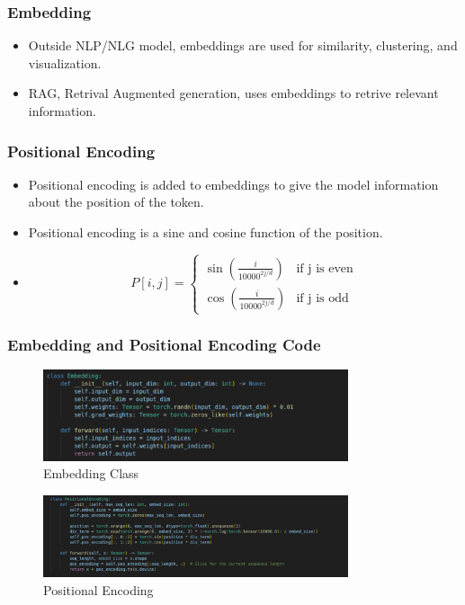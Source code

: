 \documentclass[
    10pt %
    16:9, %
]{beamer}
\begin{document}
\frame
{
  \frametitle{Embedding}
  \begin{itemize}
      \item Outside NLP/NLG model, embeddings are used for similarity, clustering, and visualization.
      \item RAG, Retrival Augmented generation, uses embeddings to retrive relevant information.
  \end{itemize}
}

\frame
{
  \frametitle{Positional Encoding}
  \begin{itemize}
      \item Positional encoding is added to embeddings to give the model information about the position of the token.
      \item Positional encoding is a sine and cosine function of the position.
      \item $$P[i, j] = \begin{cases}
        \sin\left(\frac{i}{10000^{2j/d}}\right) & \text{if j is even} \\
        \cos\left(\frac{i}{10000^{2j/d}}\right) & \text{if j is odd}
      \end{cases}$$
  \end{itemize}
}

\frame
{
  \frametitle{Embedding and Positional Encoding Code}
  \begin{figure}
    \centering
    \includegraphics[width=0.8\textwidth]{embedding_code.png}
    \caption{Embedding Class}
  \end{figure}
  \begin{figure}
    \centering
    \includegraphics[width=0.8\textwidth]{pos_code.png}
    \caption{Positional Encoding}
  \end{figure}
}
 
\end{document}
